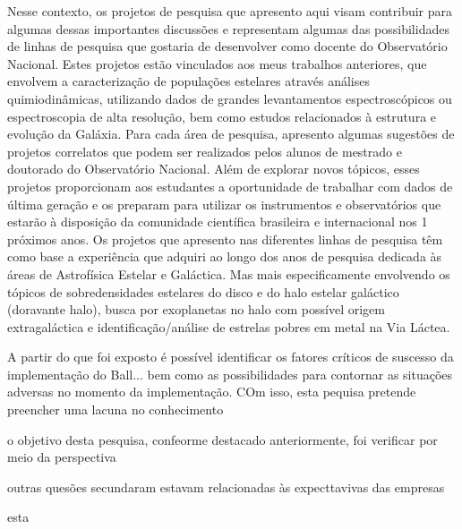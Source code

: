 \documentclass[10pt,a4paper,oneside]{book}
\begin{document}
Nesse contexto, os projetos de pesquisa que apresento aqui visam contribuir para algumas dessas importantes discussões e representam algumas das possibilidades de linhas
de pesquisa que gostaria de desenvolver como docente do Observatório Nacional. Estes
projetos estão vinculados aos meus trabalhos anteriores, que envolvem a caracterização de
populações estelares através análises quimiodinâmicas, utilizando dados de grandes levantamentos espectroscópicos ou espectroscopia de alta resolução, bem como estudos relacionados à estrutura e evolução da Galáxia.
Para cada área de pesquisa, apresento algumas sugestões de projetos correlatos que podem ser realizados pelos alunos de mestrado e doutorado do Observatório Nacional. Além
de explorar novos tópicos, esses projetos proporcionam aos estudantes a oportunidade de
trabalhar com dados de última geração e os preparam para utilizar os instrumentos e observatórios que estarão à disposição da comunidade científica brasileira e internacional nos
1
próximos anos.
Os projetos que apresento nas diferentes linhas de pesquisa têm como base a experiência
que adquiri ao longo dos anos de pesquisa dedicada às áreas de Astrofísica Estelar e Galáctica. Mas mais especificamente envolvendo os tópicos de sobredensidades estelares do
disco e do halo estelar galáctico (doravante halo), busca por exoplanetas no halo com possível origem extragaláctica e identificação/análise de estrelas pobres em metal na Via Láctea.

A partir do que foi exposto é possível identificar os fatores críticos de suscesso da implementação do Ball... bem como as possibilidades para contornar as situações adversas no momento da implementação. COm isso, esta pequisa pretende preencher uma lacuna no conhecimento 

o objetivo desta pesquisa, confeorme destacado anteriormente, foi verificar por meio da perspectiva 

outras quesões secundaram estavam relacionadas às expecttavivas das empresas 

esta
\end{document}
